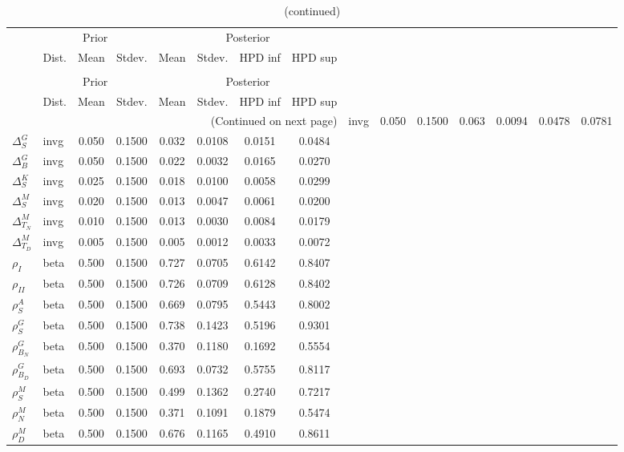  
\begin{center}
\begin{longtable}{llcccccc} 
\caption{Results from Metropolis-Hastings (parameters)}
 \label{Table:MHPosterior:1}\\
\toprule 
  & \multicolumn{3}{c}{Prior}  &  \multicolumn{4}{c}{Posterior} \\
  \cmidrule(r{.75em}){2-4} \cmidrule(r{.75em}){5-8}
  & Dist. & Mean  & Stdev. & Mean & Stdev. & HPD inf & HPD sup\\
\midrule \endfirsthead 
\caption{(continued)}\\\toprule 
  & \multicolumn{3}{c}{Prior}  &  \multicolumn{4}{c}{Posterior} \\
  \cmidrule(r{.75em}){2-4} \cmidrule(r{.75em}){5-8}
  & Dist. & Mean  & Stdev. & Mean & Stdev. & HPD inf & HPD sup\\
\midrule \endhead 
\bottomrule \multicolumn{8}{r}{(Continued on next page)} \endfoot 
\bottomrule \endlastfoot 
${\Delta^{A}_{S}}$ & invg &   0.050 & 0.1500 &   0.063& 0.0094 &  0.0478 &  0.0781 \\ 
${\Delta^{G}_{S}}$ & invg &   0.050 & 0.1500 &   0.032& 0.0108 &  0.0151 &  0.0484 \\ 
${\Delta^{G}_{B}}$ & invg &   0.050 & 0.1500 &   0.022& 0.0032 &  0.0165 &  0.0270 \\ 
${\Delta^{K}_{S}}$ & invg &   0.025 & 0.1500 &   0.018& 0.0100 &  0.0058 &  0.0299 \\ 
${\Delta^{M}_{S}}$ & invg &   0.020 & 0.1500 &   0.013& 0.0047 &  0.0061 &  0.0200 \\ 
${\Delta^{M}_{T_N}}$ & invg &   0.010 & 0.1500 &   0.013& 0.0030 &  0.0084 &  0.0179 \\ 
${\Delta^{M}_{T_D}}$ & invg &   0.005 & 0.1500 &   0.005& 0.0012 &  0.0033 &  0.0072 \\ 
${\rho_{I}}$ & beta &   0.500 & 0.1500 &   0.727& 0.0705 &  0.6142 &  0.8407 \\ 
${\rho_{II}}$ & beta &   0.500 & 0.1500 &   0.726& 0.0709 &  0.6128 &  0.8402 \\ 
${\rho^{A}_{S}}$ & beta &   0.500 & 0.1500 &   0.669& 0.0795 &  0.5443 &  0.8002 \\ 
${\rho^{G}_{S}}$ & beta &   0.500 & 0.1500 &   0.738& 0.1423 &  0.5196 &  0.9301 \\ 
${\rho^{G}_{B_N}}$ & beta &   0.500 & 0.1500 &   0.370& 0.1180 &  0.1692 &  0.5554 \\ 
${\rho^{G}_{B_D}}$ & beta &   0.500 & 0.1500 &   0.693& 0.0732 &  0.5755 &  0.8117 \\ 
${\rho^{M}_{S}}$ & beta &   0.500 & 0.1500 &   0.499& 0.1362 &  0.2740 &  0.7217 \\ 
${\rho^{M}_{N}}$ & beta &   0.500 & 0.1500 &   0.371& 0.1091 &  0.1879 &  0.5474 \\ 
${\rho^{M}_{D}}$ & beta &   0.500 & 0.1500 &   0.676& 0.1165 &  0.4910 &  0.8611 \\ 
\end{longtable}
 \end{center}
